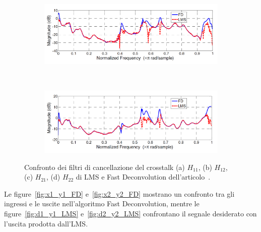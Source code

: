 \documentclass[12pt,a4paper,titlepage]{article}
\begin{document}
\begin{figure}[h]
	\ContinuedFloat
	\centering
	\begin{subfigure}{1\textwidth}
		\includegraphics[width=1\textwidth]{Immagini/H21_paper}
		\caption{}
		\label{fig:Confronto_H21_LMS_FD_paper}
	\end{subfigure}\\
	\begin{subfigure}{1\textwidth}
		\includegraphics[width=1\textwidth]{Immagini/H22_paper}
		\caption{}
		\label{fig:Confronto_H22_LMS_FD_paper}
	\end{subfigure}
	\caption{Confronto dei filtri di cancellazione del crosstalk (a) $H_{11}$, (b) $H_{12}$, (c) $H_{21}$, (d) $H_{22}$ di LMS e Fast Deconvolution dell'articolo~\cite{Li:comprehensive_comparison}.}
	\label{fig:confronto_H_LMS_FD_paper}
\end{figure}

Le figure~\ref{fig:x1_y1_FD} e~\ref{fig:x2_y2_FD} mostrano un confronto tra gli ingressi e le uscite nell'algoritmo Fast Deconvolution, mentre le figure~\ref{fig:d1_y1_LMS} e~\ref{fig:d2_y2_LMS} confrontano il segnale desiderato con l'uscita prodotta dall'LMS.
\end{document}
